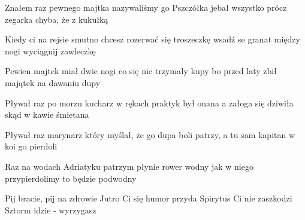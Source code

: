 \documentclass[../../../songbook.tex]{subfiles}
\begin{document}
\begin{multicols}{3}
{Znałem raz pewnego majtka \newline
nazywaliśmy go Pszczółka \newline
jebał wszystko prócz zegarka \newline
chyba, że z kukułką \newline

Kiedy ci na rejsie smutno \newline
chcesz rozerwać się troszeczkę \newline
wsadź se granat między nogi \newline
wyciągnij zawleczkę \newline

Pewien majtek miał dwie nogi \newline
co się nie trzymały kupy \newline
bo przed laty zbił majątek \newline
na dawaniu dupy \newline

Pływał raz po morzu kucharz \newline
w rękach praktyk był onana \newline
a załoga się dziwiła \newline
skąd w kawie śmietana \newline

Pływał raz marynarz który \newline
myślał, że go dupa boli \newline
patrzy, a tu sam kapitan \newline
w koi go pierdoli \newline

Raz na wodach Adriatyku \newline
patrzym płynie rower wodny \newline
jak w niego przypierdolimy \newline
to będzie podwodny \newline

Pij bracie, pij na zdrowie \newline
Jutro Ci się humor przyda \newline
Spirytus Ci nie zaszkodzi \newline
Sztorm idzie - wyrzygasz \newline
}
\end{multicols}
\end{document}
